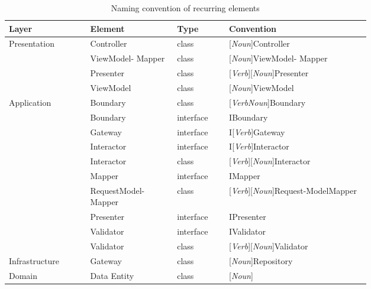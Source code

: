 \begin{table}[H]
  \footnotesize
  \caption{Naming convention of recurring elements}
  \begin{tabular}{ p{0.16\linewidth} p{0.17\linewidth} p{0.09\linewidth} p{0.29\linewidth} }
  \hline
  \textbf{Layer} & \textbf{Element} & \textbf{Type} & \textbf{Convention} \\ \hline
  Presentation & Controller & class & [\textit{Noun}]Controller \\
  & ViewModel- Mapper & class & [\textit{Noun}]ViewModel- Mapper \\
  & Presenter & class & [\textit{Verb}][\textit{Noun}]Presenter \\
  & ViewModel & class & [\textit{Noun}]ViewModel \\

  Application & Boundary & class & [\textit{VerbNoun}]Boundary \\
  & Boundary  & interface & IBoundary \\
  & Gateway  & interface & I[\textit{Verb}]Gateway \\
  & Interactor  & interface & I[\textit{Verb}]Interactor \\
  & Interactor & class & [\textit{Verb}][\textit{Noun}]Interactor \\
  & Mapper  & interface & IMapper \\
  & RequestModel-Mapper & class & [\textit{Verb}][\textit{Noun}]Request-ModelMapper \\
  & Presenter  & interface & IPresenter \\
  & Validator  & interface & IValidator \\
  & Validator & class & [\textit{Verb}][\textit{Noun}]Validator \\
  
  Infrastructure & Gateway & class & [\textit{Noun}]Repository \\

  Domain & Data Entity & class & [\textit{Noun}] \\ \hline

  \end{tabular}
  
  \label{table_element_naming_convention}
\end{table}